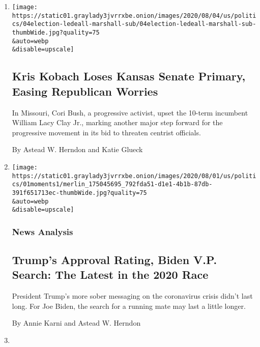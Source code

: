 \begin{enumerate}
\def\labelenumi{\arabic{enumi}.}
\item
  \href{/2020/08/04/us/politics/kobach-tlaib.html}{}

  \texttt{[image: https://static01.graylady3jvrrxbe.onion/images/2020/08/04/us/politics/04election-ledeall-marshall-sub/04election-ledeall-marshall-sub-thumbWide.jpg?quality=75\\\&auto=webp\\\&disable=upscale]}

  \hypertarget{kris-kobach-loses-kansas-senate-primary-easing-republican-worries}{%
  \subsection{Kris Kobach Loses Kansas Senate Primary, Easing Republican
  Worries}\label{kris-kobach-loses-kansas-senate-primary-easing-republican-worries}}

  In Missouri, Cori Bush, a progressive activist, upset the 10-term
  incumbent William Lacy Clay Jr., marking another major step forward
  for the progressive movement in its bid to threaten centrist
  officials.

  By Astead W. Herndon and Katie Glueck
\item
  \href{/2020/08/01/us/politics/trump-biden-polls-vp.html}{}

  \texttt{[image: https://static01.graylady3jvrrxbe.onion/images/2020/08/01/us/politics/01moments1/merlin\_175045695\_792fda51-d1e1-4b1b-87db-391f651713ec-thumbWide.jpg?quality=75\\\&auto=webp\\\&disable=upscale]}

  \hypertarget{news-analysis}{%
  \subsubsection{News Analysis}\label{news-analysis}}

  \hypertarget{trumps-approval-rating-biden-vp-search-the-latest-in-the-2020-race}{%
  \subsection{Trump's Approval Rating, Biden V.P. Search: The Latest in
  the 2020
  Race}\label{trumps-approval-rating-biden-vp-search-the-latest-in-the-2020-race}}

  President Trump's more sober messaging on the coronavirus crisis
  didn't last long. For Joe Biden, the search for a running mate may
  last a little longer.

  By Annie Karni and Astead W. Herndon
\item
  \href{/2020/07/25/us/politics/trump-biden-polls-coronavirus.html}{}


\end{enumerate}
